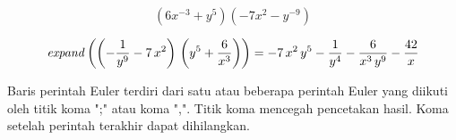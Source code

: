 \documentclass[a4paper,10pt]{article}
\begin{document}
\begin{eulernotebook}
\begin{eulercomment}
\begin{eulercomment}
\begin{eulercomment}
\end{eulercomment}
\begin{eulerformula}
\[
(6x^{-3}+y^5)(-7x^2-y^{-9})
\]
\end{eulerformula}
\begin{eulerformula}
\[
{\it expand}\left(\left(-\frac{1}{y^9}-7\,x^2\right)\,\left(y^5+  \frac{6}{x^3}\right)\right)=-7\,x^2\,y^5-\frac{1}{y^4}-\frac{6}{x^3  \,y^9}-\frac{42}{x}
\]
\end{eulerformula}
\begin{eulercomment}
Baris perintah Euler terdiri dari satu atau beberapa perintah Euler
yang diikuti oleh titik koma ";" atau koma ",". Titik koma mencegah
pencetakan hasil. Koma setelah perintah terakhir dapat dihilangkan.


\end{eulercomment}
\end{eulercomment}
\end{eulercomment}
\end{eulernotebook}
\end{document}
